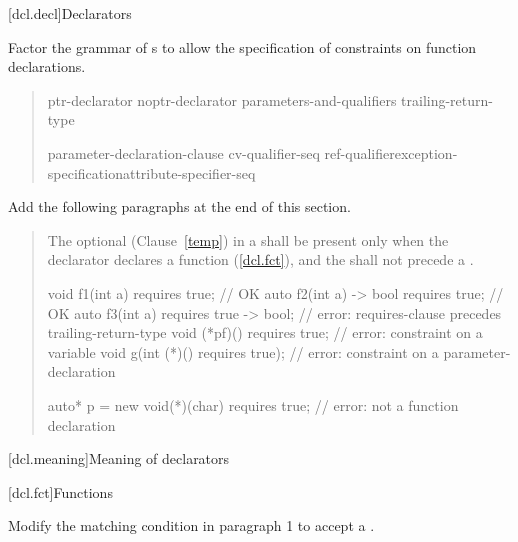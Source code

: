 
[dcl.decl]{Declarators}

Factor the grammar of s to
allow the specification of constraints on function declarations.

\begin{quote}
\setcounter{Paras}{3}


\begin{bnf}
\br
    ptr-declarator\br
    noptr-declarator parameters-and-qualifiers trailing-return-type 


\br
  \terminal{(} parameter-declaration-clause \terminal{)} cv-qualifier-seq\opt\br
    \hspace*{\bnfindentinc}ref-qualifier\opt exception-specification\opt attribute-specifier-seq\opt {}\opt
\end{bnf}
\end{quote}


Add the following paragraphs at the end of this section.

\begin{quote}
\pnum
The optional  (Clause~\ref{temp}) in a 
 shall be present only when the declarator declares a 
function (\ref{dcl.fct}), and the  shall not precede a 
.

\enterexample
\begin{codeblock}
void f1(int a) requires true;         // OK
auto f2(int a) -> bool requires true; // OK
auto f3(int a) requires true -> bool; // error: requires-clause precedes trailing-return-type
void (*pf)() requires true;           // error: constraint on a variable
void g(int (*)() requires true);      // error: constraint on a parameter-declaration
  
auto* p = new void(*)(char) requires true; // error: not a function declaration
\end{codeblock}
\exitexample
\end{quote}


\setcounter{section}{2}
[dcl.meaning]{Meaning of declarators}


\setcounter{section}{4}
[dcl.fct]{Functions}

Modify the matching condition in paragraph 1 to accept a 
.
      
